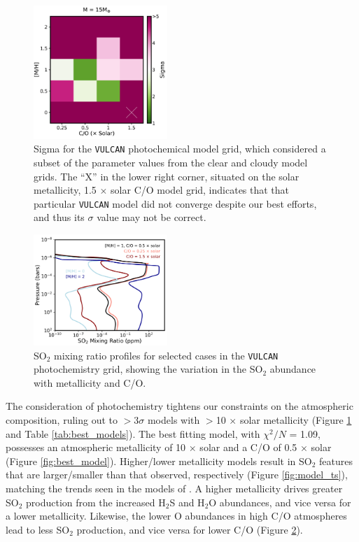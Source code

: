 \documentclass[twocolumn]{aastex63} %
\begin{document}
\begin{figure}[ht]
    \centering
    \includegraphics[width=0.45\textwidth]{fig_sigma_hip67522b_newdata_60k_vul_NoOutlier.pdf}
    \caption{Sigma for the \texttt{VULCAN} photochemical model grid, which considered a subset of the parameter values from the clear and cloudy model grids. The ``X'' in the lower right corner, situated on the solar metallicity, 1.5 $\times$ solar C/O model grid, indicates that that particular \texttt{VULCAN} model did not converge despite our best efforts, and thus its $\sigma$ value may not be correct.}
    \label{fig:photochemistry_chisq}
\end{figure}

\begin{figure}[ht]
    \centering
    \includegraphics[width=0.45\textwidth]{fig_hip67522b_so2.pdf}
    \caption{SO$_2$ mixing ratio profiles for selected cases in the \texttt{VULCAN} photochemistry grid, showing the variation in the SO$_2$ abundance with metallicity and C/O. }
    \label{fig:so2abun}
\end{figure}

The consideration of photochemistry tightens our constraints on the atmospheric composition, ruling out to $>$3$\sigma$ models with $>$10 $\times$ solar metallicity (Figure \ref{fig:photochemistry_chisq} and Table \ref{tab:best_models}). The best fitting model, with $\chi^2/N$ = 1.09, possesses an atmospheric metallicity of 10 $\times$ solar and a C/O of 0.5 $\times$ solar (Figure \ref{fig:best_model}). Higher/lower metallicity models result in SO$_2$ features that are larger/smaller than that observed, respectively (Figure \ref{fig:model_ts}), matching the trends seen in the models of \citet{Tsai2023}. A higher metallicity drives greater SO$_2$ production from the increased H$_2$S and H$_2$O abundances, and vice versa for a lower metallicity. Likewise, the lower O abundances in high C/O atmospheres lead to less SO$_2$ production, and vice versa for lower C/O (Figure \ref{fig:so2abun}). 
\end{document}
